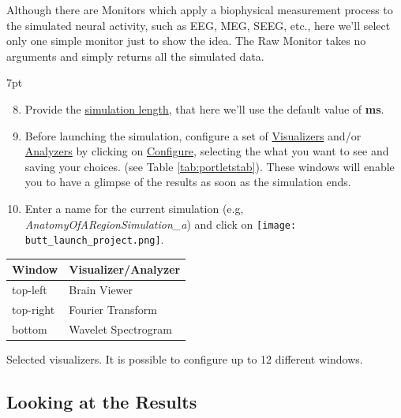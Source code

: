 \documentclass{tufte-handout}
\newenvironment{simulation}{%
  \def\FrameCommand{%
    \hspace{1pt}%
    {\color{ForestGreen}\vrule width 2pt}%
    {\color{simulationshade}\vrule width 4pt}%
    \colorbox{simulationshade}%
  }%
  \MakeFramed{\advance\hsize-\width\FrameRestore}%
  \noindent\hspace{-4.55pt}%
  \begin{adjustwidth}{}{7pt}%
  \vspace{2pt}\vspace{2pt}%
}
{%
  \vspace{2pt}\end{adjustwidth}\endMakeFramed%
}
\begin{document}
Although there are Monitors which apply a biophysical measurement process to
the simulated neural activity, such as EEG, MEG, SEEG, etc.,  here we'll select only
one simple monitor just to show the idea. The Raw Monitor takes no arguments
and simply returns all the simulated data. 


\begin{simulation}
\begin{enumerate}[resume]
  \setcounter{enumi}{7}
 \item Provide the \underline{simulation length}, that here we'll use the default value of \textbf{\unit[1000]{ms}}.
 \item Before launching the simulation, configure a set of \underline{Visualizers} and/or \underline{Analyzers} by clicking on \underline{Configure}, selecting the what you want to see and saving your choices. (see Table \ref{tab:portletstab}). These windows will enable you to have a glimpse of the results as soon as the simulation ends. 
 \item Enter a name for the current simulation (e.g, \textit{AnatomyOfARegionSimulation\_a}) and click on  \texttt{[image: butt\_launch\_project.png]}.
\end{enumerate}
\end{simulation}

\begin{margintable}
  \centering
  \selectfont
  \begin{tabular}{ll}
    \toprule
    Window & Visualizer/Analyzer \\
    \midrule
             top-left        &   Brain Viewer             \\
             top-right       &   Fourier Transform        \\
             bottom          &   Wavelet Spectrogram      \\
    \bottomrule
  \end{tabular}
  \caption{Selected visualizers. It is possible to configure up to 12 different windows. }
  \label{tab:portletstab}
\end{margintable}


\subsection{Looking at the Results}\label{sec:results}
\end{document}
